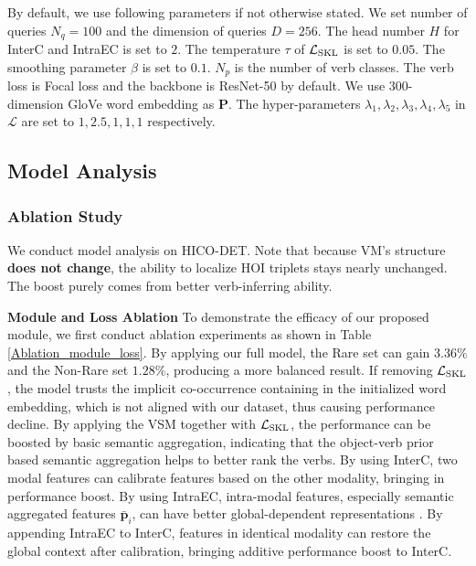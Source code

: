 \documentclass[letterpaper]{article} %
\begin{document}
By default, we use following parameters if not otherwise stated. We set number of queries $N_q=100$ and the dimension of queries $D=256$. The head number $H$ for InterC and IntraEC is set to $2$. The temperature $\tau$ of $\mathcal{L}_{\rm SKL}$ is set to $0.05$. The smoothing parameter $\beta$ is set to $0.1$. $N_p$ is the number of verb classes. The verb loss is Focal loss and the backbone is ResNet-50 by default. We use $300$-dimension GloVe word embedding \cite{pennington2014glove} as $\bm{P}$. The hyper-parameters $\lambda_1, \lambda_2, \lambda_3, \lambda_4, \lambda_5$ in $\mathcal{L}$ are set to $1,2.5,1,1,1$ respectively.


\subsection{Model Analysis}
\subsubsection{Ablation Study} We conduct model analysis on HICO-DET. Note that because VM's structure \textbf{does not change}, the ability to localize HOI triplets stays nearly unchanged. The boost purely comes from better verb-inferring ability. 

\textbf{Module and Loss Ablation} To demonstrate the efficacy of our proposed module, we first conduct ablation experiments as shown in Table \ref{Ablation_module_loss}. By applying our full model, the Rare set can gain $3.36\%$ and the Non-Rare set $1.28\%$, producing a more balanced result. If removing $\mathcal{L}_{\rm SKL}$, the model trusts the implicit co-occurrence containing in the initialized word embedding, which is not aligned with our dataset, thus causing performance decline. By applying the VSM together with $\mathcal{L}_{\rm SKL}$, the performance can be boosted by basic semantic aggregation, indicating that the object-verb prior based semantic aggregation helps to better rank the verbs. By using InterC, two modal features can calibrate features based on the other modality, bringing in performance boost. By using IntraEC, intra-modal features, especially semantic aggregated features $\bar{\bm{p}}_{i}$, can have better global-dependent representations \cite{AttentionAlluNeed}. By appending IntraEC to InterC, features in identical modality can restore the global context after calibration, bringing additive performance boost to InterC. 
\end{document}
